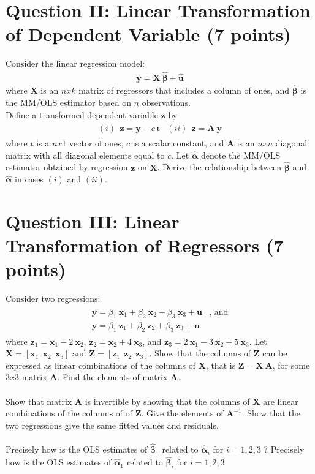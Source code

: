 \documentclass[letterpaper,12pt]{article}
\theoremstyle{dotlessS}
\begin{document}
\section*{Question II: Linear Transformation of Dependent Variable (7 points)}
Consider the linear regression model:
\begin{eqnarray*}
\bm{y}=\bm{X} \: \bm{\hat{\beta}}+\bm{\hat{u}}
\end{eqnarray*}
where $\bm{X}$ is an $nxk$ matrix of regressors that includes a column of ones, and $\bm{\hat{\beta}}$ is the MM/OLS estimator based on $n$ observations.\\
Define a transformed dependent variable $\bm{z}$ by
\begin{eqnarray*}
\begin{array}{lr}
(i) \: \:  \bm{z}=\bm{y}-c \: \bm{\iota} & (ii) \: \:  \bm{z}=\bm{A} \: \bm{y}
\end{array}
\end{eqnarray*}
where $\bm{\iota}$ is a $nx1$ vector of ones, $c$ is a scalar constant, and $\bm{A}$ is an $nxn$ diagonal matrix with all diagonal elements equal to $c$. Let $\bm{\hat{\alpha}}$ denote the MM/OLS estimator obtained by regression $\bm{z}$ on $\bm{X}$. Derive the relationship between $\bm{\hat{\beta}}$ and $\bm{\hat{\alpha}}$ in cases $(i)$ and $(ii)$.
    

\section*{Question III: Linear Transformation of Regressors (7 points)}
Consider two regressions:
\begin{eqnarray*}
\begin{array}{ll}
\bm{y}=\beta_1 \: \bm{x}_1+\beta_2 \: \bm{x}_2+\beta_3 \: \bm{x}_3+\bm{u} &\text{, and}  \\[1.2ex]
\bm{y}=\beta_1 \: \bm{z}_1+\beta_2 \: \bm{z}_2+\beta_3 \: \bm{z}_3+\bm{u} &
\end{array}
\end{eqnarray*}
where $\bm{z}_1=\bm{x}_1-2 \: \bm{x}_2$, $\bm{z}_2=\bm{x}_2+4 \: \bm{x}_3$, and $\bm{z}_3=2 \: \bm{x}_1-3 \: \bm{x}_2+5 \: \bm{x}_3$. Let $\bm{X}=[\bm{x}_1 \: \: \bm{x}_2 \: \: \bm{x}_3]$ and $\bm{Z}=[\bm{z}_1 \: \: \bm{z}_2 \: \: \bm{z}_3]$. Show that the columns of $\bm{Z}$ can be expressed as linear combinations of the columns of $\bm{X}$, that is $\bm{Z}=\bm{X \: A}$, for some $3x3$ matrix $\bm{A}$. Find the elements of matrix $\bm{A}$.  \\
\\
Show that matrix $\bm{A}$ is invertible by showing that the columns of $\bm{X}$ are linear combinations of the columns of of $\bm{Z}$. Give the elements of $\bm{A}^{-1}$. Show that the two regressions give the same fitted values and residuals. \\
\\
Precisely how is the OLS estimates of $\bm{\hat{\beta}}_1$ related to $\bm{\hat{\alpha}}_i$ for $i=1,2,3$ ?  Precisely how is the OLS estimates of $\bm{\hat{\alpha}}_1$ related to $\bm{\hat{\beta}}_i$ for $i=1,2,3$ 
\end{document}
